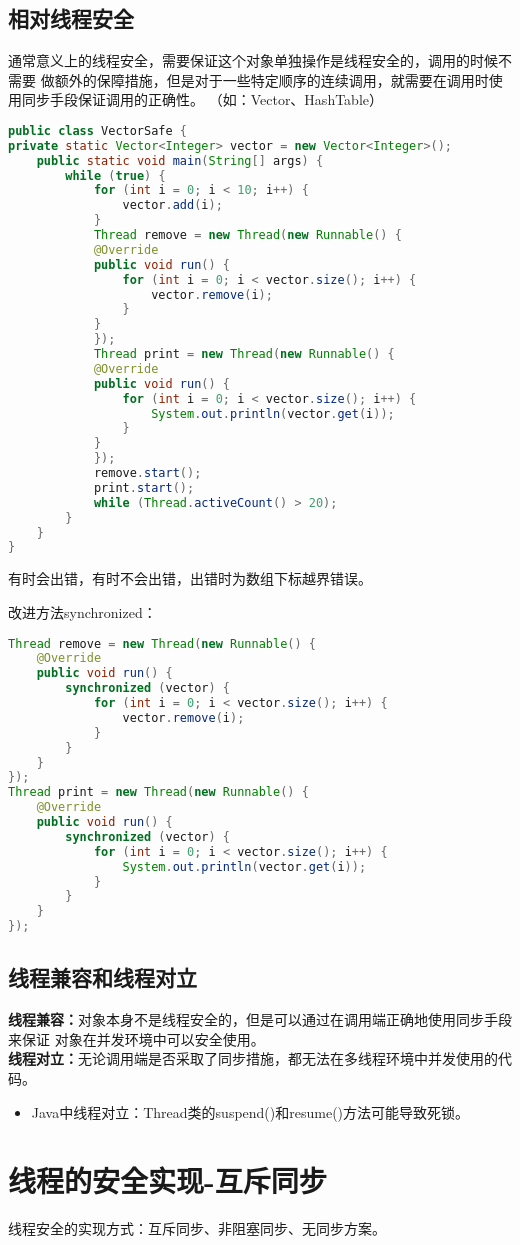 \subsection{相对线程安全}
通常意义上的线程安全，需要保证这个对象单独操作是线程安全的，调用的时候不需要
做额外的保障措施，但是对于一些特定顺序的连续调用，就需要在调用时使用同步手段保证调用的正确性。
（如：Vector、HashTable）
\begin{lstlisting}[language=java]
public class VectorSafe {
private static Vector<Integer> vector = new Vector<Integer>();
	public static void main(String[] args) {
		while (true) {
			for (int i = 0; i < 10; i++) {
				vector.add(i);
			}
			Thread remove = new Thread(new Runnable() {
			@Override
			public void run() {
				for (int i = 0; i < vector.size(); i++) {
					vector.remove(i);
				}
			}
			});
			Thread print = new Thread(new Runnable() {
			@Override
			public void run() {
				for (int i = 0; i < vector.size(); i++) {
					System.out.println(vector.get(i));
				}
			}
			});
			remove.start();
			print.start();
			while (Thread.activeCount() > 20);
		}
	}
}
\end{lstlisting}
\par 有时会出错，有时不会出错，出错时为数组下标越界错误。
\par 改进方法synchronized：
\begin{lstlisting}[language=java]
Thread remove = new Thread(new Runnable() {
	@Override
	public void run() {
		synchronized (vector) {
			for (int i = 0; i < vector.size(); i++) {
				vector.remove(i);
			}
		}
	}
});
Thread print = new Thread(new Runnable() {
	@Override
	public void run() {
		synchronized (vector) {
			for (int i = 0; i < vector.size(); i++) {
				System.out.println(vector.get(i));
			}
		}
	}
});
\end{lstlisting}
\subsection{线程兼容和线程对立}
\noindent \textbf{线程兼容：}对象本身不是线程安全的，但是可以通过在调用端正确地使用同步手段来保证
对象在并发环境中可以安全使用。
\\ \textbf{线程对立：}无论调用端是否采取了同步措施，都无法在多线程环境中并发使用的代码。
\begin{itemize}
	\item Java中线程对立：Thread类的suspend()和resume()方法可能导致死锁。
\end{itemize}

\section{线程的安全实现-互斥同步}
线程安全的实现方式：互斥同步、非阻塞同步、无同步方案。
